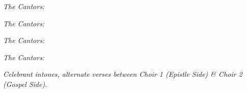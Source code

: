 \documentclass[letterpaper,12pt]{book} %
\renewcommand{\needspace}[1]{
	\checkoddpage\ifoddpage\oldneedspace{#1}\else\fi
}
\begin{document}
\bigskip
\noindent\emph{The Cantors:}

{
	\smallskip
	\def\annot{\small \Vbar{} 4.}

}

\bigskip
\noindent\emph{The Cantors:}

{
	\smallskip
	\def\annot{\small \Vbar{} 5.}

}

\bigskip
\needspace{6\baselineskip}
\noindent\emph{The Cantors:}

{
	\def\annot{\small \Vbar{} 6.}


	\bigskip
	\noindent\emph{The Cantors:}

	\printinvitatoryant{}
}


{
	\bigskip
	\noindent\emph{Celebrant intones, alternate verses between Choir 1 (Epistle Side) \& Choir 2 (Gospel Side).}

}

\pagebreak
\def\alwaysrepeatantiphon{T}
{
	
}

{
	
}

{
	
}

\pagebreak
{
	\def\gabcfolder{../Tenebrae}
	
}
\end{document}
